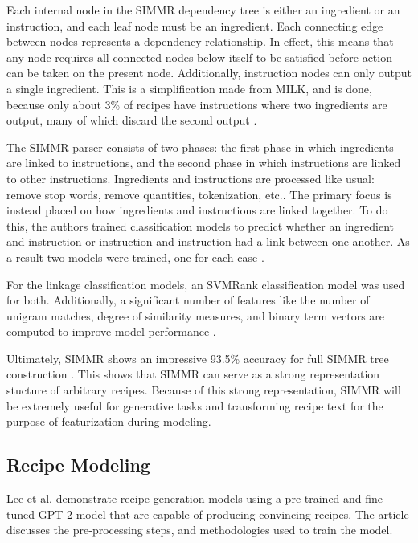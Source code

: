 \documentclass[sigconf]{acmart}
\begin{document}
Each internal node in the SIMMR dependency tree is either an ingredient or an instruction, and each leaf node must be an ingredient. Each connecting edge between nodes represents a dependency relationship. In effect, this means that any node requires all connected nodes below itself to be satisfied before action can be taken on the present node. Additionally, instruction nodes can only output a single ingredient. This is a simplification made from MILK, and is done, because only about 3\% of recipes have instructions where two ingredients are output, many of which discard the second output \cite{NLPSIMMR}.

The SIMMR parser consists of two phases: the first phase in which ingredients are linked to instructions, and the second phase in which instructions are linked to other instructions. Ingredients and instructions are processed like usual: remove stop words, remove quantities, tokenization, etc.. The primary focus is instead placed on how ingredients and instructions are linked together. To do this, the authors trained classification models to predict whether an ingredient and instruction or instruction and instruction had a link between one another. As a result two models were trained, one for each case \cite{NLPSIMMR}.

For the linkage classification models, an SVMRank classification model was used for both. Additionally, a significant number of features like the number of unigram matches, degree of similarity measures, and binary term vectors are computed to improve model performance \cite{NLPSIMMR}.

Ultimately, SIMMR shows an impressive 93.5\% accuracy for full SIMMR tree construction \cite{NLPSIMMR}. This shows that SIMMR can serve as a strong representation stucture of arbitrary recipes. Because of this strong representation, SIMMR will be extremely useful for generative tasks and transforming recipe text for the purpose of featurization during modeling.

\subsection{Recipe Modeling}
Lee et al. \cite{NLPRecipeGPT} demonstrate recipe generation models using a pre-trained and fine-tuned GPT-2 model that are capable of producing convincing recipes. The article discusses the pre-processing steps, and methodologies used to train the model.
\end{document}
